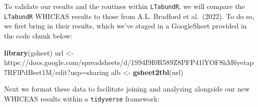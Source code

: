 \documentclass[
]{book}
\newenvironment{Shaded}{\begin{snugshade}}{\end{snugshade}}
\newcommand{\FunctionTok}[1]{\textcolor[rgb]{0.13,0.29,0.53}{\textbf{#1}}}
\newcommand{\NormalTok}[1]{#1}
\newcommand{\OtherTok}[1]{\textcolor[rgb]{0.56,0.35,0.01}{#1}}
\newcommand{\StringTok}[1]{\textcolor[rgb]{0.31,0.60,0.02}{#1}}
\begin{document}
To validate our results and the routines within \texttt{LTabundR}, we will compare the \texttt{LTabundR} WHICEAS results to those from A.L. Bradford et al.~(2022). To do so, we first bring in their results, which we've staged in a GoogleSheet provided in the code chunk below:

\begin{Shaded}
\begin{Highlighting}[]
\FunctionTok{library}\NormalTok{(gsheet)}
\NormalTok{url }\OtherTok{\textless{}{-}} \StringTok{\textquotesingle{}https://docs.google.com/spreadsheets/d/1S94I9I0R589Z8PFP41lYOF8hM6yetap7RFlPdBeet1M/edit?usp=sharing\textquotesingle{}}
\NormalTok{alb }\OtherTok{\textless{}{-}} \FunctionTok{gsheet2tbl}\NormalTok{(url)}
\end{Highlighting}
\end{Shaded}

Next we format these data to facilitate joining and analyzing alongside our new WHICEAS results within a \texttt{tidyverse} framework:
\end{document}
